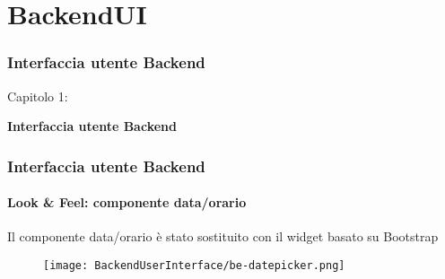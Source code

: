 %

\section{BackendUI}
\begin{frame}[fragile]
	\frametitle{Interfaccia utente Backend}

	\begin{center}\huge{Capitolo 1:}\end{center}
	\begin{center}\huge{\color{typo3darkgrey}\textbf{Interfaccia utente Backend}}\end{center}

\end{frame}


\begin{frame}[fragile]
	\frametitle{Interfaccia utente Backend}
	\framesubtitle{Look \& Feel: componente data/orario}

	Il componente data/orario è stato sostituito con il widget basato su Bootstrap
	\begin{figure}
		\texttt{[image: BackendUserInterface/be-datepicker.png]}
	\end{figure}

\end{frame}



